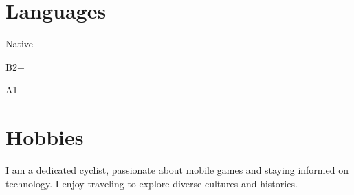 \section*{Languages}
\begin{description}[font=$\bullet$\hspace{1em}, itemsep=0em]
    \item[Spanish] Native
    \item[English] B2+
    \item[German] A1
\end{description}

\section*{Hobbies}
I am a dedicated cyclist, passionate about mobile games and staying informed on technology. I enjoy traveling to explore diverse cultures and histories.




